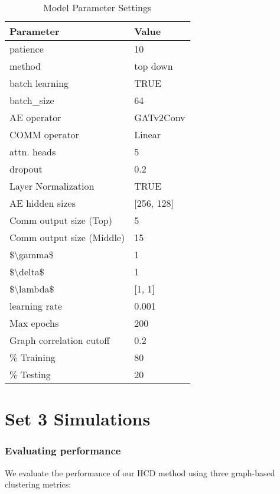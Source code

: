\documentclass[
]{article}
\begin{document}
\begin{longtable}[t]{ll}
\caption{\label{tab:unnamed-chunk-1}Model Parameter Settings}\\
\toprule
Parameter & Value\\
\midrule
patience & 10\\
method & top down\\
batch learning & TRUE\\
batch\_size & 64\\
AE operator & GATv2Conv\\
\addlinespace
COMM operator & Linear\\
attn. heads & 5\\
dropout & 0.2\\
Layer Normalization & TRUE\\
AE hidden sizes & {}[256, 128]\\
\addlinespace
Comm output size (Top) & 5\\
Comm output size (Middle) & 15\\
\$\textbackslash{}gamma\$ & 1\\
\$\textbackslash{}delta\$ & 1\\
\$\textbackslash{}lambda\$ & {}[1, 1]\\
\addlinespace
learning rate & 0.001\\
Max epochs & 200\\
Graph correlation cutoff & 0.2\\
\% Training & 80\\
\% Testing & 20\\
\bottomrule
\end{longtable}

\section{Set 3 Simulations}\label{set-3-simulations}

\subsubsection*{Evaluating performance}\label{evaluating-performance}

We evaluate the performance of our HCD method using three graph-based
clustering metrics:
\end{document}
